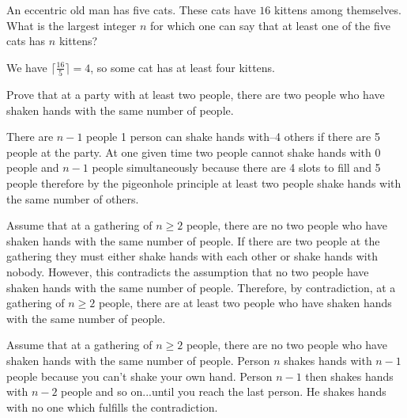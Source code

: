 \begin{exer}
An eccentric old man has five cats. These cats have $16$ kittens among
themselves. What is the largest integer $n$ for which one can say
that at least one of the five cats has $n$ kittens?\\
\answerlinetwo
\begin{answer}
We have $ \lceil{\frac{16}{5}}\rceil = 4$, so some cat has at least four kittens.
\end{answer}
\end{exer}

\begin{eval}\label{eval:partyhands}
Prove that at a party with at least two people, 
there are two people who have shaken hands with the same 
number of people.
\begin{spfenum}
\item
There are $n-1$ people 1 person can shake hands with--4 others if there are 5 people at the party.  
At one given time two people cannot shake hands with 0 people and $n-1$ people simultaneously because 
there are 4 slots to fill and 5 people therefore by the pigeonhole principle at least two people 
shake hands with the same number of others.

\noindent
\evallinetwo
\item
Assume that at a gathering of $n\geq 2$ people, there are no two people who have shaken hands with the 
same number of people.  If there are two people at the gathering they must either shake hands with each other 
or shake hands with nobody.  However, this contradicts the assumption that no two people have shaken hands
with the same number of people.  Therefore, by contradiction, at a gathering of $n\geq 2$ people, 
there are at 
least two people who have shaken hands with the same number of people.

\noindent
\evallinetwo
\item
Assume that at a gathering of $n\geq 2$ people, there are no two people who have shaken hands with the 
same number of people.  Person $n$ shakes hands with $n-1$ people because you can't shake your own hand.
Person $n-1$ then shakes hands with $n-2$ people and so on...until you reach the last person.
He shakes hands with no one which fulfills the contradiction.


\end{spfenum}
\end{eval}
